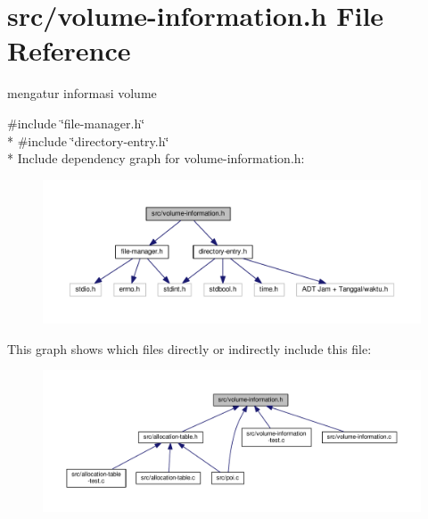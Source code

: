 \hypertarget{volume-information_8h}{\section{src/volume-\/information.h File Reference}
\label{volume-information_8h}
}


mengatur informasi volume  


{\ttfamily \#include \char`\"{}file-\/manager.\-h\char`\"{}}\\*
{\ttfamily \#include \char`\"{}directory-\/entry.\-h\char`\"{}}\\*
Include dependency graph for volume-\/information.h\-:\nopagebreak
\begin{figure}[H]
\begin{center}
\leavevmode
\includegraphics[width=350pt]{volume-information_8h__incl}
\end{center}
\end{figure}
This graph shows which files directly or indirectly include this file\-:
\nopagebreak
\begin{figure}[H]
\begin{center}
\leavevmode
\includegraphics[width=350pt]{volume-information_8h__dep__incl}
\end{center}
\end{figure}
